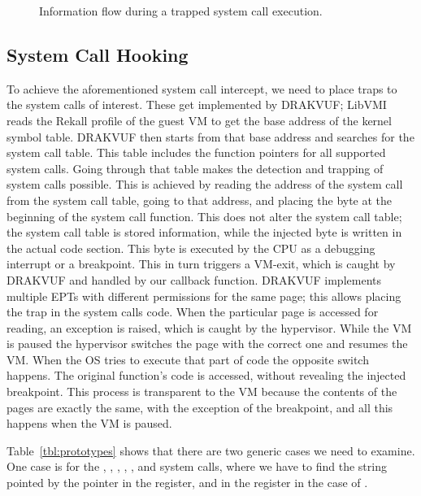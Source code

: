 \begin{table}[ht]
\begin{tabular}{ccccccc}
	\bottomrule
\end{tabular}
\end{table}



\begin{figure}[ht]
	\centering
	
	\caption{Information flow during a trapped system call execution.}
	\label{fig:overview}
\end{figure}


\subsection{System Call Hooking}\label{sub:hooking}

\par To achieve the aforementioned system call intercept, we need to place traps to the system calls of interest. These get implemented by DRAKVUF; LibVMI reads the Rekall profile of the guest \ac{VM} to get the base address of the kernel symbol table. DRAKVUF then starts from that base address and searches for the system call table. This table includes the function pointers for all supported system calls. Going through that table makes the detection and trapping of system calls possible. This is achieved by reading the address of the system call from the system call table, going to that address, and placing the  byte at the beginning of the system call function. This does not alter the system call table; the system call table is stored information, while the injected byte is written in the actual code section. This byte is executed by the \ac{CPU} as a debugging interrupt or a breakpoint. This in turn triggers a VM-exit, which is caught by DRAKVUF and handled by our callback function. DRAKVUF implements multiple \ac{EPT}s with different permissions for the same page; this allows placing the trap in the system calls code. When the particular page is accessed for reading, an exception is raised, which is caught by the hypervisor. While the \ac{VM} is paused the hypervisor switches the page with the correct one and resumes the \ac{VM}. When the \ac{OS} tries to execute that part of code the opposite switch happens. The original function's code is accessed, without revealing the injected breakpoint. This process is transparent to the \ac{VM} because the contents of the pages are exactly the same, with the exception of the breakpoint, and all this happens when the \ac{VM} is paused. 

\par Table~\ref{tbl:prototypes} shows that there are two generic cases we need to examine. One case is for the , , , , , and  system calls, where we have to find the string pointed by the pointer in the  register, and in the  register in the case of . 

